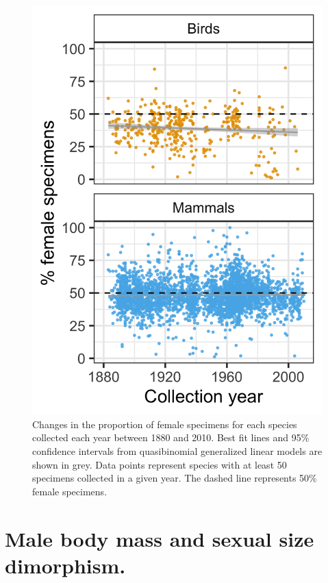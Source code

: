 \documentclass[a4paper, 12pt]{article}
\begin{document}
\begin{figure}[H]
 \centering
  \includegraphics[scale = 0.4]{figures/years-all.png}
  \caption{Changes in the proportion of female specimens for each species collected each year between 1880 and 2010. 
  Best fit lines and 95\% confidence intervals from quasibinomial generalized linear models are shown in grey. 
  Data points represent species with at least 50 specimens collected in a given year. 
  The dashed line represents 50\% female specimens.
}
  \label{fig-time}
\end{figure} 

\newpage
\section{Male body mass and sexual size dimorphism.}
\end{document}
